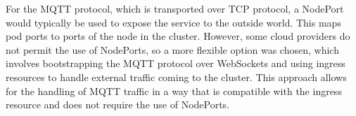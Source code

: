 For the MQTT protocol, which is transported over TCP protocol, a NodePort \cite{kubernetes_docs} would typically be used to expose the service to the outside world. This maps pod ports to ports of the node in the cluster. However, some cloud providers do not permit the use of NodePorts, so a more flexible option was chosen, which involves bootstrapping the MQTT protocol over WebSockets and using ingress resources to handle external traffic coming to the cluster. This approach allows for the handling of MQTT traffic in a way that is compatible with the ingress resource and does not require the use of NodePorts.